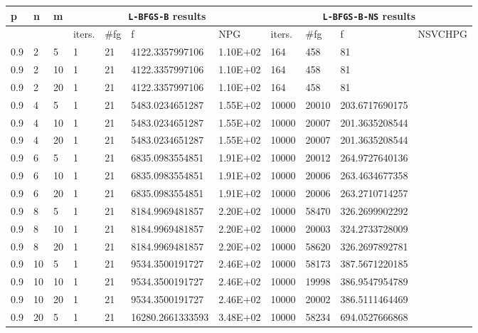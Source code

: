 \begin{table}
  \tiny
  \begin{center}
    \begin{tabular}{|l|l|l|l|l|l|l|l|l|l|l|}
      \hline
      p  & n & m  & \multicolumn{4}{|c|}{\texttt{L-BFGS-B} results} & \multicolumn{4}{|c|}{\texttt{L-BFGS-B-NS} results} \\ \hline
  &  &  & iters. & \#fg & f & NPG & iters. & \#fg & f & NSVCHPG \\ \hline
      0.9 & 2 & 5 & 1 & 21 & 4122.3357997106 & 1.10E+02 & 164 & 458 & 81 & \\
      0.9 & 2 & 10 & 1 & 21 & 4122.3357997106 & 1.10E+02 & 164 & 458 & 81 & \\
      0.9 & 2 & 20 & 1 & 21 & 4122.3357997106 & 1.10E+02 & 164 & 458 & 81 & \\
      0.9 & 4 & 5 & 1 & 21 & 5483.0234651287 & 1.55E+02 & 10000 & 20010 & 203.6717690175 & \\
      0.9 & 4 & 10 & 1 & 21 & 5483.0234651287 & 1.55E+02 & 10000 & 20007 & 201.3635208544 & \\
      0.9 & 4 & 20 & 1 & 21 & 5483.0234651287 & 1.55E+02 & 10000 & 20007 & 201.3635208544 & \\
      0.9 & 6 & 5 & 1 & 21 & 6835.0983554851 & 1.91E+02 & 10000 & 20012 & 264.9727640136 & \\
      0.9 & 6 & 10 & 1 & 21 & 6835.0983554851 & 1.91E+02 & 10000 & 20006 & 263.4634677358 & \\
      0.9 & 6 & 20 & 1 & 21 & 6835.0983554851 & 1.91E+02 & 10000 & 20006 & 263.2710714257 & \\
      0.9 & 8 & 5 & 1 & 21 & 8184.9969481857 & 2.20E+02 & 10000 & 58470 & 326.2699902292 & \\
      0.9 & 8 & 10 & 1 & 21 & 8184.9969481857 & 2.20E+02 & 10000 & 20003 & 324.2733728009 & \\
      0.9 & 8 & 20 & 1 & 21 & 8184.9969481857 & 2.20E+02 & 10000 & 58620 & 326.2697892781 & \\
      0.9 & 10 & 5 & 1 & 21 & 9534.3500191727 & 2.46E+02 & 10000 & 58173 & 387.5671220185 & \\
      0.9 & 10 & 10 & 1 & 21 & 9534.3500191727 & 2.46E+02 & 10000 & 19998 & 386.9547954789 & \\
      0.9 & 10 & 20 & 1 & 21 & 9534.3500191727 & 2.46E+02 & 10000 & 20002 & 386.5111464469 & \\
      0.9 & 20 & 5 & 1 & 21 & 16280.2661333593 & 3.48E+02 & 10000 & 58234 & 694.0527666868 & \\

\end{tabular}
\end{center}
\end{table}
